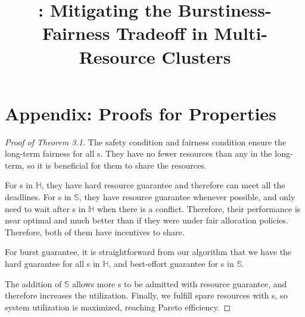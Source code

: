 \documentclass[letterpaper,twocolumn,10pt]{article}
\begin{document}
\date{}

\title{\Large \bf \name: Mitigating the Burstiness-Fairness Tradeoff in Multi-Resource Clusters}



\maketitle

\thispagestyle{empty}

\appendix
\section*{Appendix: Proofs for \name Properties}
\label{sec:app}

\begin{proof}[Proof of Theorem 3.1]%
	The safety condition and fairness condition ensure the long-term fairness for all {\batchq}s. They have no fewer resources than any {\burstq} in the long-term, so it is beneficial for them to share the resources. 
	
	For {\burstq}s in $\mathbb{H}$, they have hard resource guarantee and therefore can meet all the deadlines. For {\burstq}s in $\mathbb{S}$, they have resource guarantee whenever possible, and only need to wait after {\burstq}s in $\mathbb{H}$ when there is a conflict. Therefore, their performance is near optimal and much better than if they were under fair allocation policies. Therefore, both of them have incentives to share. %
	
	For burst guarantee, it is straightforward from our algorithm that we have the hard guarantee for all {\burstq}s in $\mathbb{H}$, and best-effort guarantee for {\burstq}s in $\mathbb{S}$.
	
	The addition of $\mathbb{S}$ allows more {\burstq}s to be admitted with resource guarantee, and therefore increases the {\burstq} utilization. Finally, we fulfill spare resources with {\batchq}s, so system utilization is maximized, reaching Pareto efficiency.
\end{proof}
\end{document}
